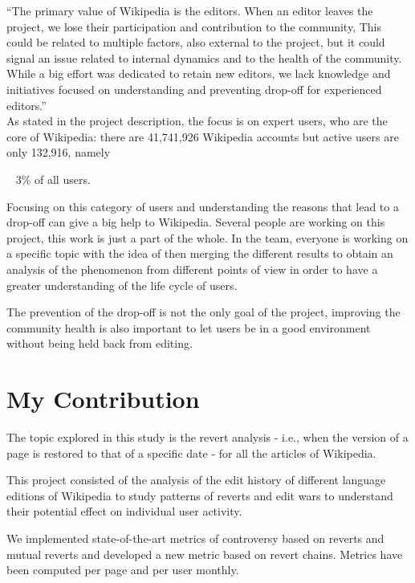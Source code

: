 “The primary value of Wikipedia is the editors. When an editor leaves the project, we lose their
participation and contribution to the community, This could be related to multiple factors, also
external to the project, but it could signal an issue related to internal dynamics and to the health
of the community. While a big effort was dedicated to retain new editors, we lack knowledge and
initiatives focused on understanding and preventing drop-off for experienced editors.”
\\
As stated in the project description, the focus is on expert users, who are the core of Wikipedia:
there are 41,741,926 Wikipedia accounts but active users are only 132,916, namely%

~ 3\% of all users. 

Focusing on this category of users and understanding the reasons that lead to a drop-off can give a
big help to Wikipedia. Several people are working on this project, this work is just a part of the whole.
In the team, everyone is working on a specific topic with the idea of then merging the different
results to obtain an analysis of the phenomenon from different points of view in order to have a
greater understanding of the life cycle of users.  

The prevention of the drop-off is not the only goal of the project, improving the community health
is also important to let users be in a good environment without being held back from editing. 

\section{My Contribution}
\label{sec:project}
The topic explored in this study is the revert analysis - i.e., when the version of a page is
restored to that of a specific date - for all the articles of Wikipedia.

This project consisted of the analysis of the edit history of different language editions of
Wikipedia to study patterns of reverts and edit wars to understand their potential effect on
individual user activity.

We implemented state-of-the-art metrics of controversy based on reverts and mutual reverts and
developed a new metric based on revert chains. Metrics have been computed per page and per user
monthly.



